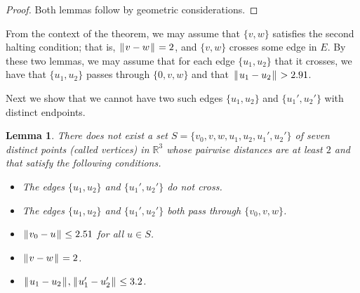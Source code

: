 \documentclass[11pt]{amsart}
\newcommand{\ring}[1]{\mathbb{#1}}
\def\|{{\hskip0.1em|\hskip-0.1em|\hskip0.1em}}
\newtheorem{lemma}{Lemma}
\begin{document}
\begin{proof} Both lemmas follow by geometric considerations.
\end{proof}

From the context of the theorem, we may assume that $\{v,w\}$ satisfies the second halting condition;
that is, $\|v-w\|=2$, and $\{v,w\}$ crosses some edge in $E$.
By these two lemmas, we may assume that for each edge $\{u_1,u_2\}$ that it crosses,
we have that $\{u_1,u_2\}$ passes through $\{0,v,w\}$ and that $\|u_1-u_2\|>2.91$.

Next we show that we cannot have two such edges $\{u_1,u_2\}$ and $\{u_1',u_2'\}$ with distinct endpoints.

\begin{lemma} There does not exist a set $S=\{v_0,v,w,u_1,u_2,u_1',u_2'\}$ of seven distinct points (called vertices)
in $\ring{R}^3$ whose pairwise distances are at least $2$ and that satisfy the following conditions.
\begin{itemize}
\item The edges $\{u_1,u_2\}$ and $\{u_1',u_2'\}$ do not cross.
\item The edges $\{u_1,u_2\}$ and $\{u_1',u_2'\}$ both pass through $\{v_0,v,w\}$.
\item $\|v_0-u\|\le 2.51$ for all $u\in S$.
\item $\|v-w\|=2$.
\item $\|u_1-u_2\|,\|u_1'-u_2'\|\le 3.2$.
\end{itemize}
\end{lemma}
\end{document}
